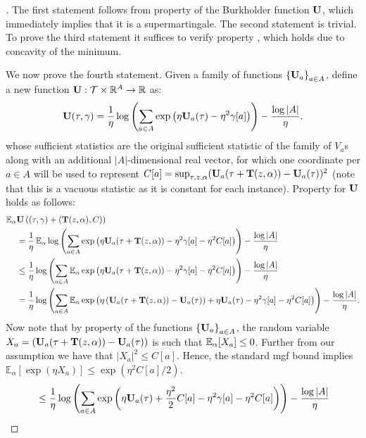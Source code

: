 \begin{proof}[]
The first statement follows from property \propthree{} of the Burkholder function $\burk$, which immediately implies that it is a supermartingale. The second statement is trivial. To prove the third statement it suffices to verify property \propthree, which holds due to concavity of the minimum. 

We now prove the fourth statement. Given a family of \Bfun functions $\crl*{\burk_a}_{a\in{}A}$, define a new \Bfun function $\burk: \T \times \mathbb{R}^A \to\reals$ as:
$$
\burk(\tau, \gamma) = \frac{1}{\eta} \log\left(\sum_{a \in A} \exp\left(\eta \burk_a(\tau) - \eta^2 \gamma[a] \right)\right)  - \frac{\log|A|}{\eta}.
$$
whose sufficient statistics are the original sufficient statistic of the family of $V_a$s along with an additional $|A|$-dimensional real vector, for which one coordinate per $a \in A$ will be used to represent $C[a] = \sup_{\tau, z ,\alpha} (\burk_a(\tau + \suff(z,\alpha)) - \burk_a(\tau))^2$ (note that this is a vacuous statistic as it is constant for each instance). Property \propthree{} for $\burk$ holds as follows:
\begin{align*}
 \En_\alpha &\burk\left((\tau,\gamma) + (\suff(z,\alpha) , C) \right) \\
 & = \frac{1}{\eta} \En_\alpha \log\left(\sum_{a \in A} \exp\left(\eta \burk_a(\tau + \suff(z,\alpha)) - \eta^2 \gamma[a] - \eta^2 C[a]\right)\right) - \frac{\log|A|}{\eta} \\
 & \le  \frac{1}{\eta}  \log\left(\sum_{a \in A} \En_\alpha \exp\left(\eta \burk_a(\tau + \suff(z,\alpha))  - \eta^2 \gamma[a] - \eta^2 C[a] \right)\right) - \frac{\log|A|}{\eta} \\
 & =  \frac{1}{\eta}  \log\left(\sum_{a \in A} \En_\alpha \exp\left(\eta \left(\burk_a(\tau + \suff(z,\alpha)) - \burk_a(\tau) \right) + \eta\burk_a(\tau)  - \eta^2 \gamma[a] - \eta^2 C[a]\right)\right) - \frac{\log|A|}{\eta}.
\end{align*}
Now note that by property \propthree{} of the \Bfun functions $\crl*{\burk_a}_{a\in{}A}$, the random variable $X_a = \left(\burk_a(\tau + \suff(z,\alpha)) - \burk_a(\tau) \right)$ is such that $\En_{\alpha}[X_a] \le 0$. Further from our assumption we have that $|X_a|^2 \le C[a]$. Hence, the standard mgf bound implies $\mathbb{E}_{\alpha}[\exp(\eta X_a)] \le \exp(\eta^2 C[a]/2)$.
\begin{align*}
 & \le  \frac{1}{\eta}  \log\left(\sum_{a \in A} \exp\left(\eta\burk_a(\tau)  + \frac{\eta^2}{2} C[a]  - \eta^2 \gamma[a] - \eta^2 C[a] \right)\right) - \frac{\log|A|}{\eta} \\

\end{align*}
\end{proof}
